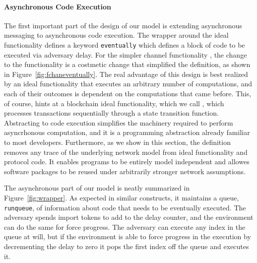 \paragraph{Asynchronous Code Execution} 
The first important part of the design of our model is extending asynchronous messaging to asynchronous code execution.
The wrapper around the ideal functionality defines a keyword \texttt{eventually} which defines a block of code to be executed via adversary delay.
For the simpler channel functionality \Fchan, the change to the functionality is a costmetic change that simplified the definition, as shown in Figure~\ref{fig:fchaneventually}.
The real advantage of this design is best realized by an ideal functionality that executes an arbitrary number of computations, and each of their outcomes is dependent on the computations that came before.
This, of course, hints at a blockchain ideal functionality, which we call \Fledger, which processes transactions sequentially through a state transition function.
Abstracting to code execution simplifies the machinery required to perform asyncrhonous computation, and it is a programming abstraction already familiar to most developers.
Furthermore, as we show in this section, the definition removes any trace of the underlying network model from ideal functionality and protocol code.
It enables programs to be entirely model independent and allowes software packages to be reused under arbitrarily stronger network assumptions.


The asynchronous part of our model is neatly summarized in Figure~\ref{fig:wrapper}.
As expected in similar constructs, it maintains a queue, \texttt{runqueue}, of information about code that needs to be eventually executed. 
The adversary spends import tokens to add to the delay counter, and the environment can do the same for force progress.
The adversary can execute any index in the queue at will, but if the environment is able to force progress in the execution by decrementing the delay to zero it pops the first index off the queue and executes it.

